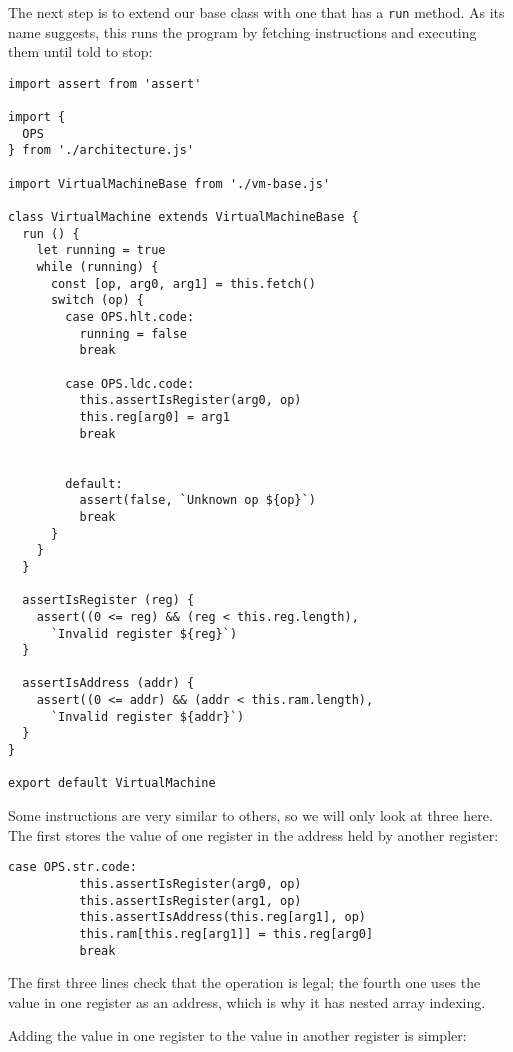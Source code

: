 \documentclass[krantzl]{krantz}
\begin{document}
The next step is to extend our base class with one that has a \texttt{run} method.
As its name suggests,
this runs the program by fetching instructions and executing them until told to stop:


\begin{lstlisting}[frame=single,frameround=tttt]
import assert from 'assert'

import {
  OPS
} from './architecture.js'

import VirtualMachineBase from './vm-base.js'

class VirtualMachine extends VirtualMachineBase {
  run () {
    let running = true
    while (running) {
      const [op, arg0, arg1] = this.fetch()
      switch (op) {
        case OPS.hlt.code:
          running = false
          break

        case OPS.ldc.code:
          this.assertIsRegister(arg0, op)
          this.reg[arg0] = arg1
          break


        default:
          assert(false, `Unknown op ${op}`)
          break
      }
    }
  }

  assertIsRegister (reg) {
    assert((0 <= reg) && (reg < this.reg.length),
      `Invalid register ${reg}`)
  }

  assertIsAddress (addr) {
    assert((0 <= addr) && (addr < this.ram.length),
      `Invalid register ${addr}`)
  }
}

export default VirtualMachine
\end{lstlisting}



Some instructions are very similar to others,
so we will only look at three here.
The first stores the value of one register in the address held by another register:


\begin{lstlisting}[frame=single,frameround=tttt]
        case OPS.str.code:
          this.assertIsRegister(arg0, op)
          this.assertIsRegister(arg1, op)
          this.assertIsAddress(this.reg[arg1], op)
          this.ram[this.reg[arg1]] = this.reg[arg0]
          break
\end{lstlisting}



\noindent The first three lines check that the operation is legal;
the fourth one uses the value in one register as an address,
which is why it has nested array indexing.


Adding the value in one register to the value in another register is simpler:
\end{document}
